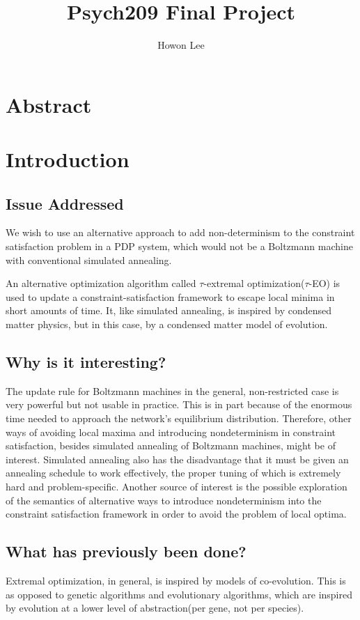 \documentclass[12pt]{article}
\begin{document}
\title{Psych209 Final Project}
\author{Howon Lee}
\maketitle
\section*{Abstract}
\section*{Introduction}
\subsection*{Issue Addressed}

We wish to use an alternative approach to add non-determinism to the constraint satisfaction problem in a PDP system, which would not be a Boltzmann machine with conventional simulated annealing.

An alternative optimization algorithm called $\tau$-extremal optimization($\tau$-EO) is used to update a constraint-satisfaction framework to escape local minima in short amounts of time. It, like simulated annealing, is inspired by condensed matter physics, but in this case, by a condensed matter model of evolution.

\subsection*{Why is it interesting?}

The update rule for Boltzmann machines in the general, non-restricted case is very powerful but not usable in practice. This is in part because of the enormous time needed to approach the network's equilibrium distribution. Therefore, other ways of avoiding local maxima and introducing nondeterminism in constraint satisfaction, besides simulated annealing of Boltzmann machines, might be of interest. Simulated annealing also has the disadvantage that it must be given an annealing schedule to work effectively, the proper tuning of which is extremely hard and problem-specific. Another source of interest is the possible exploration of the semantics of alternative ways to introduce nondeterminism into the constraint satisfaction framework in order to avoid the problem of local optima.

\subsection*{What has previously been done?}
Extremal optimization, in general, is inspired by models of co-evolution. This is as opposed to genetic algorithms and evolutionary algorithms, which are inspired by evolution at a lower level of abstraction(per gene, not per species).
\end{document}
